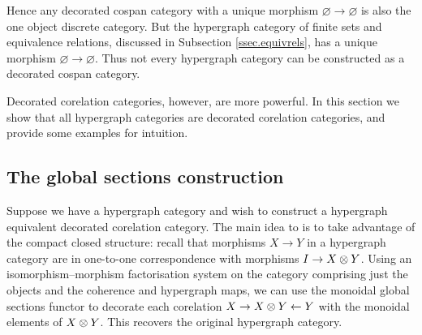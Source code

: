 Hence any decorated cospan category with a unique morphism $\varnothing \to
\varnothing$ is also the one object discrete category. But the hypergraph
category of finite sets and equivalence relations, discussed in Subsection
\ref{ssec.equivrels}, has a unique morphism $\varnothing \to \varnothing$.  Thus
not every hypergraph category can be constructed as a decorated cospan category.

Decorated corelation categories, however, are more powerful. In this section we
show that all hypergraph categories are decorated corelation categories, and
provide some examples for intuition.

\subsection{The global sections construction}
Suppose we have a hypergraph category and wish to construct a hypergraph
equivalent decorated corelation category. The main idea to is to take advantage
of the compact closed structure: recall that morphisms $X \to Y$ in a hypergraph
category are in one-to-one correspondence with morphisms $I \to X\otimes Y$. Using
an isomorphism--morphism factorisation system on the category comprising just
the objects and the coherence and hypergraph maps, we can use the monoidal
global sections functor to decorate each corelation $X \to X \otimes Y \leftarrow
Y$ with the monoidal elements of $X\otimes Y$. This recovers the original hypergraph
category.


